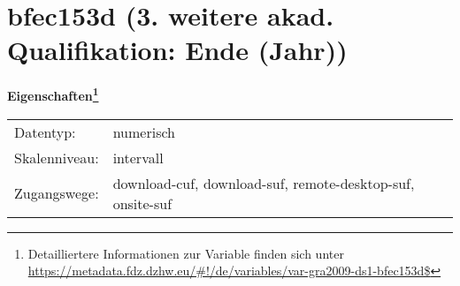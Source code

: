 
    \setcounter{footnote}{0}

    \vspace*{-1.8cm}
	\section{bfec153d (3. weitere akad. Qualifikation: Ende (Jahr))}
	\label{section:bfec153d}



    \vspace*{0.5cm}
    \noindent\textbf{Eigenschaften\footnote{Detailliertere Informationen zur Variable finden sich unter
		\url{https://metadata.fdz.dzhw.eu/\#!/de/variables/var-gra2009-ds1-bfec153d$}}}\\
	\begin{tabularx}{\hsize}{@{}lX}
	Datentyp: & numerisch \\
	Skalenniveau: & intervall \\
	Zugangswege: &
	  download-cuf, 
	  download-suf, 
	  remote-desktop-suf, 
	  onsite-suf
 \\
    \end{tabularx}



